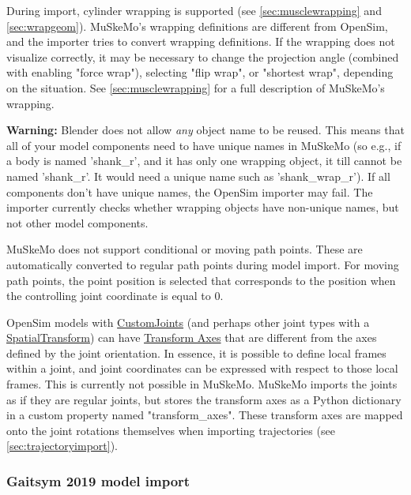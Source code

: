 \documentclass{article}
\begin{document}
During import, cylinder wrapping is supported (see \ref{sec:musclewrapping} and \ref{sec:wrapgeom}). MuSkeMo's wrapping definitions are different from OpenSim, and the importer tries to convert wrapping definitions. If the wrapping does not visualize correctly, it may be necessary to change the projection angle (combined with enabling "force wrap"), selecting "flip wrap", or "shortest wrap", depending on the situation. See \ref{sec:musclewrapping} for a full description of MuSkeMo's wrapping.

\textbf{Warning:} Blender does not allow \textit{any} object name to be reused. This means that all of your model components need to have unique names in MuSkeMo (so e.g., if a body is named 'shank\_r', and it has only one wrapping object, it till cannot be named 'shank\_r'. It would need a unique name such as 'shank\_wrap\_r'). If all components don't have unique names, the OpenSim importer may fail. The importer currently checks whether wrapping objects have non-unique names, but not other model components.

MuSkeMo does not support conditional or moving path points. These are automatically converted to regular path points during model import. For moving path points, the point position is selected that corresponds to the position when the controlling joint coordinate is equal to 0.

OpenSim models with \href{https://simtk.org/api_docs/opensim/api_docs/classOpenSim_1_1CustomJoint.html}{CustomJoints} (and perhaps other joint types with a \href{https://simtk.org/api_docs/opensim/api_docs/classOpenSim_1_1SpatialTransform.html}{SpatialTransform}) can have \href{https://simtk.org/api_docs/opensim/api_docs/classOpenSim_1_1TransformAxis.html}{Transform Axes} that are different from the axes defined by the joint orientation. In essence, it is possible to define local frames within a joint, and joint coordinates can be expressed with respect to those local frames. This is currently not possible in MuSkeMo. MuSkeMo imports the joints as if they are regular joints, but stores the transform axes as a Python dictionary in a custom property named "transform\_axes". These transform axes are mapped onto the joint rotations themselves when importing trajectories (see \ref{sec:trajectoryimport}).


\subsubsection{Gaitsym 2019 model import}
\end{document}
